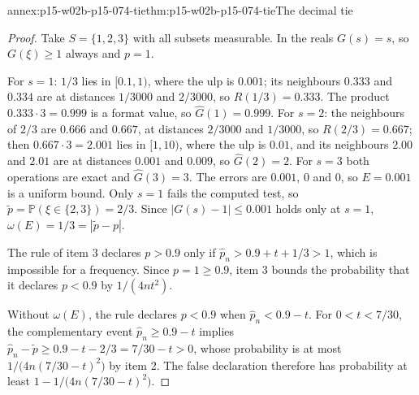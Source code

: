 \begin{annexitem}{annex:p15-w02b-p15-074-tie}{thm:p15-w02b-p15-074-tie}{The decimal tie}
\begin{proof}
Take \(S=\{1,2,3\}\) with all subsets measurable. In the reals
\(G(s)=s\), so \(G(\xi)\geq1\) always and \(p=1\).

For \(s=1\): \(1/3\) lies in \([0.1,1)\), where the ulp is \(0.001\); its
neighbours \(0.333\) and \(0.334\) are at distances \(1/3000\) and
\(2/3000\), so \(R(1/3)=0.333\). The product \(0.333\cdot3=0.999\) is a
format value, so \(\widehat G(1)=0.999\). For \(s=2\): the neighbours of
\(2/3\) are \(0.666\) and \(0.667\), at distances \(2/3000\) and
\(1/3000\), so \(R(2/3)=0.667\); then \(0.667\cdot3=2.001\) lies in
\([1,10)\), where the ulp is \(0.01\), and its neighbours \(2.00\) and
\(2.01\) are at distances \(0.001\) and \(0.009\), so \(\widehat G(2)=2\).
For \(s=3\) both operations are exact and \(\widehat G(3)=3\).
The errors are \(0.001\), \(0\) and \(0\), so \(E=0.001\) is a uniform
bound. Only \(s=1\) fails the computed test, so
\(\widetilde p=\mathbb P(\xi\in\{2,3\})=2/3\). Since \(|G(s)-1|\leq0.001\)
holds only at \(s=1\), \(\omega(E)=1/3=|\widetilde p-p|\).

The rule of item 3 declares \(p>0.9\) only if
\(\widehat p_n>0.9+t+1/3>1\), which is impossible for a frequency.
Since \(p=1\geq0.9\), item 3 bounds the probability that it declares
\(p<0.9\) by \(1/(4nt^2)\).

Without \(\omega(E)\), the rule declares \(p<0.9\) when
\(\widehat p_n<0.9-t\). For \(0<t<7/30\), the complementary event
\(\widehat p_n\geq0.9-t\) implies
\(\widehat p_n-\widetilde p\geq0.9-t-2/3=7/30-t>0\), whose probability is
at most \(1/\bigl(4n(7/30-t)^2\bigr)\) by item 2. The false declaration
therefore has probability at least \(1-1/\bigl(4n(7/30-t)^2\bigr)\).
\end{proof}
\end{annexitem}
